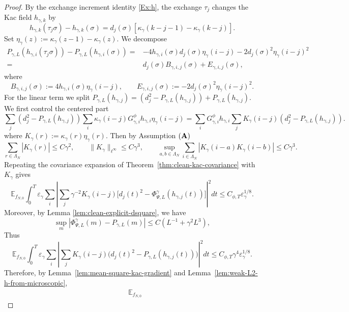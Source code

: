 \documentclass{article}
\begin{document}
\begin{proof}
By the exchange increment identity \eqref{Ex:h}, the exchange \(\tau_j\) changes the Kac field $h_{\gamma,k}$ by
\[
h_{\gamma,k}(\tau_j\sigma)-h_{\gamma,k}(\sigma)
=
d_j(\sigma)
\left[
\kappa_\gamma(k-j-1)-\kappa_\gamma(k-j)
\right].
\]
Set
\(
\eta_\gamma(z):=\kappa_\gamma(z-1)-\kappa_\gamma(z).
\)
We decompose
\begin{align*}
    P_{\gamma,L}(h_{\gamma,i}(\tau_j\sigma)) -P_{\gamma,L}(h_{\gamma,i}(\sigma)) = &  -4h_{\gamma,i}(\sigma)d_j(\sigma)\eta_\gamma(i-j) -2d_j(\sigma)^2\eta_\gamma(i-j)^2  \\
    = & d_j(\sigma)B_{\gamma,i,j}(\sigma) + E_{\gamma,i,j}(\sigma),
\end{align*}
where
\[
 B_{\gamma,i,j}(\sigma) := 4h_{\gamma,i}(\sigma)\eta_\gamma(i-j), \qquad E_{\gamma,i,j}(\sigma) := -2d_j(\sigma)^2\eta_\gamma(i-j)^2.
\]
For the linear term we split $P_{\gamma,L}(h_{\gamma,j}) = \left(d_j^2- P_{\gamma,L}(h_{\gamma,j})\right) + P_{\gamma,L}(h_{\gamma,j}) $.
We first control the centered part
\[
\sum_j \left( d_j^2-P_{\gamma,L}(h_{\gamma,j}) \right)
\sum_i\kappa_\gamma(i-j)G_{\gamma,i}^{\phi}
h_{\gamma,i}\eta_\gamma(i-j)
=
\sum_iG_{\gamma,i}^{\phi}h_{\gamma,i}
\sum_jK_\gamma(i-j) \left( d_j^2-P_{\gamma,L}(h_{\gamma,j}) \right).
\]
where $K_\gamma(r):=\kappa_\gamma(r)\eta_\gamma(r)$.
Then by Assumption \(({\bf A})\)
\[
\sum_{r \in \Lambda_N}| K_\gamma(r)|\le C\gamma^2,\qquad
\|K_\gamma\|_{\ell^\infty}\le C\gamma^3,\qquad
\sup_{a,b \in \Lambda_N}\sum_{i \in \Lambda_N}| K_\gamma(i-a) K_\gamma(i-b)|\le C\gamma^3 .
\]
Repeating the covariance expansion of Theorem~\ref{thm:clean-kac-covariance} with \(K_\gamma\) gives
\[
\mathbb E_{f_{N,0}}
\int_0^T
\varepsilon_\gamma\sum_i
\left|
\sum_j \gamma^{-2}K_\gamma(i-j)
\bigl[d_j(t)^2-\Phi_{\Psi,L}^{\gamma}(h_{\gamma,j}(t))\bigr]
\right|^2dt
\le C_{\phi,T}\varepsilon_\gamma^{1/8}.
\]
Moreover, by Lemma \ref{lem:clean-explicit-dsquare}, we have
\[
\sup_m|\Phi_{\Psi,L}^{\gamma}(m)-P_{\gamma,L}(m)|
\le C(L^{-1}+\gamma^2L^3),
\]
Thus
\begin{equation}\label{eq:differentiated-centered-kac-bound}
\mathbb E_{f_{N,0}}
\int_0^T
\varepsilon_\gamma\sum_i
\left|
\sum_jK_\gamma(i-j)\bigl(d_j(t)^2-P_{\gamma,L}(h_{\gamma,j}(t))\bigr)
\right|^2dt
\le C_{\phi,T}\gamma^4\varepsilon_\gamma^{1/8}.
\end{equation}
Therefore, by Lemma~\ref{lem:mean-square-kac-gradient} and Lemma~\ref{lem:weak-L2-h-from-microscopic},
\begin{align}\label{eq:eakerf0}
&
\mathbb E_{f_{N,0}}

\end{align}
\end{proof}
\end{document}
